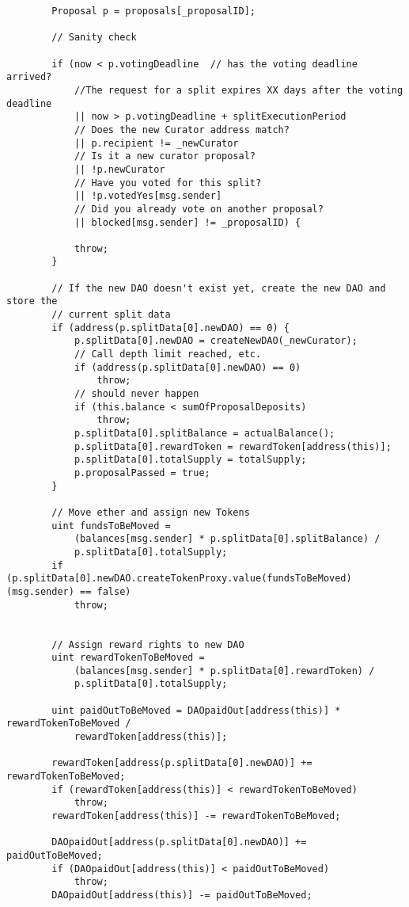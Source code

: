 \documentclass[9pt,oneside]{amsart}
\begin{document}
\begin{appendix}
\begin{verbatim}
        Proposal p = proposals[_proposalID];

        // Sanity check

        if (now < p.votingDeadline  // has the voting deadline arrived?
            //The request for a split expires XX days after the voting deadline
            || now > p.votingDeadline + splitExecutionPeriod
            // Does the new Curator address match?
            || p.recipient != _newCurator
            // Is it a new curator proposal?
            || !p.newCurator
            // Have you voted for this split?
            || !p.votedYes[msg.sender]
            // Did you already vote on another proposal?
            || blocked[msg.sender] != _proposalID) {

            throw;
        }

        // If the new DAO doesn't exist yet, create the new DAO and store the
        // current split data
        if (address(p.splitData[0].newDAO) == 0) {
            p.splitData[0].newDAO = createNewDAO(_newCurator);
            // Call depth limit reached, etc.
            if (address(p.splitData[0].newDAO) == 0)
                throw;
            // should never happen
            if (this.balance < sumOfProposalDeposits)
                throw;
            p.splitData[0].splitBalance = actualBalance();
            p.splitData[0].rewardToken = rewardToken[address(this)];
            p.splitData[0].totalSupply = totalSupply;
            p.proposalPassed = true;
        }

        // Move ether and assign new Tokens
        uint fundsToBeMoved =
            (balances[msg.sender] * p.splitData[0].splitBalance) /
            p.splitData[0].totalSupply;
        if (p.splitData[0].newDAO.createTokenProxy.value(fundsToBeMoved)(msg.sender) == false)
            throw;


        // Assign reward rights to new DAO
        uint rewardTokenToBeMoved =
            (balances[msg.sender] * p.splitData[0].rewardToken) /
            p.splitData[0].totalSupply;

        uint paidOutToBeMoved = DAOpaidOut[address(this)] * rewardTokenToBeMoved /
            rewardToken[address(this)];

        rewardToken[address(p.splitData[0].newDAO)] += rewardTokenToBeMoved;
        if (rewardToken[address(this)] < rewardTokenToBeMoved)
            throw;
        rewardToken[address(this)] -= rewardTokenToBeMoved;

        DAOpaidOut[address(p.splitData[0].newDAO)] += paidOutToBeMoved;
        if (DAOpaidOut[address(this)] < paidOutToBeMoved)
            throw;
        DAOpaidOut[address(this)] -= paidOutToBeMoved;


\end{verbatim}
\end{appendix}
\end{document}
